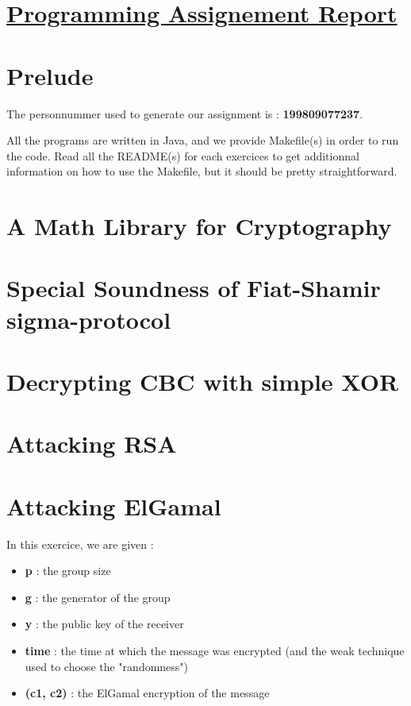 \documentclass[12pt]{article}
\begin{document}
\section* {\underline{Programming Assignement Report}}

\section*{Prelude}

The personnummer used to generate our assignment is : \textbf{{\large 199809077237}}.

All the programs are written in Java, and we provide Makefile(s) in order to run the code. Read all the README(s) for each exercices to get additionnal information on how to use the Makefile, but it should be pretty straightforward.

\section{A Math Library for Cryptography}

\newpage
\section{Special Soundness of Fiat-Shamir sigma-protocol}

\newpage
\section{Decrypting CBC with simple XOR}

\newpage
\section{Attacking RSA}

\newpage
\section{Attacking ElGamal}

In this exercice, we are given :
\begin{itemize}
    \item \textbf{p} : the group size
    \item \textbf{g} : the generator of the group
    \item \textbf{y} : the public key of the receiver
    \item \textbf{time} : the time at which the message was encrypted (and the weak technique used to choose the "randomness")
    \item \textbf{(c1, c2)} : the ElGamal encryption of the message
\end{itemize}
\end{document}
